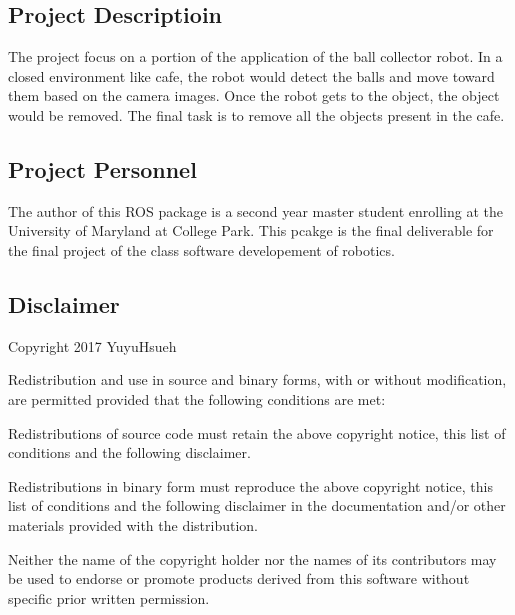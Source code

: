 \href{https://travis-ci.org/yhsueh/final_project}{\tt } \href{https://coveralls.io/github/yhsueh/final_project?branch=master}{\tt }

\subsection*{Project Descriptioin}

The project focus on a portion of the application of the ball collector robot. In a closed environment like cafe, the robot would detect the balls and move toward them based on the camera images. Once the robot gets to the object, the object would be removed. The final task is to remove all the objects present in the cafe.

\subsection*{Project Personnel}

The author of this R\+OS package is a second year master student enrolling at the University of Maryland at College Park. This pcakge is the final deliverable for the final project of the class software developement of robotics.

\subsection*{Disclaimer}

Copyright 2017 Yuyu\+Hsueh

Redistribution and use in source and binary forms, with or without modification, are permitted provided that the following conditions are met\+:


\begin{DoxyEnumerate}
\item Redistributions of source code must retain the above copyright notice, this list of conditions and the following disclaimer.
\item Redistributions in binary form must reproduce the above copyright notice, this list of conditions and the following disclaimer in the documentation and/or other materials provided with the distribution.
\item Neither the name of the copyright holder nor the names of its contributors may be used to endorse or promote products derived from this software without specific prior written permission.
\end{DoxyEnumerate}

